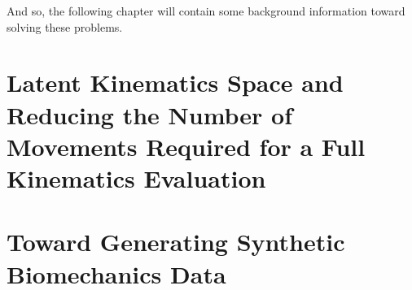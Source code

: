 And so, the following chapter will contain some background information toward solving these problems.

\section{Latent Kinematics Space and Reducing the Number of Movements Required for a Full Kinematics Evaluation}
\label{sec:latent-kinematics-space}



\section{Toward Generating Synthetic Biomechanics Data}
\label{sec:synthetic-biomechanics-data}





